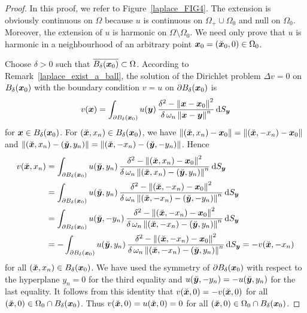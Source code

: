 \begin{proof}
In this proof, we refer to Figure~\ref{laplace_FIG4}.
The extension is obviously continuous on $\Omega$ because $u$ is
continuous on $\Omega_+\cup \Omega_0$ and null on $\Omega_0$.
Moreover, the extension of $u$ is harmonic on $\Omega \setminus \Omega_0$.
We need only prove that $u$ is harmonic in a neighbourhood of an
arbitrary point ${\bm{x}}_0 = (\breve{{\bm{x}}}_0,0) \in \Omega_0$.

Choose $\delta >0$ such that $\overline{B_\delta({\bm{x}}_0)} \subset \Omega$.
According to Remark~\ref{laplace_exist_a_ball}, the solution of the
Dirichlet problem
$\Delta v = 0$ on $B_\delta({\bm{x}}_0)$ with the boundary condition $v=u$ on
$\partial B_\delta({\bm{x}}_0)$ is
\[
v({\bm{x}}) = \int_{\partial B_\delta({\bm{x}}_0)} u({\bm{y}}) \,
\frac{\delta^2-\left\|{\bm{x}}-{\bm{x}}_0\right\|^2}
{\delta \, \omega_n \left\|{\bm{x}}-{\bm{y}}\right\|^n} \,\mathrm{d}{S}_{{\bm{y}}}
\]
for ${\bm{x}} \in B_\delta({\bm{x}}_0)$.
For $(\breve{{\bm{x}}},x_n) \in B_\delta({\bm{x}}_0)$, we have
$\displaystyle \|(\breve{{\bm{x}}},x_n)-{\bm{x}}_0\| =
\|(\breve{{\bm{x}}},-x_n)-{\bm{x}}_0\|$
and
$\displaystyle \|(\breve{{\bm{x}}},x_n)-(\breve{{\bm{y}}},y_n)\| =
\|(\breve{{\bm{x}}},-x_n)-(\breve{{\bm{y}}}, -y_n)\|$.
Hence
\begin{align*}
v(\breve{{\bm{x}}},x_n) &=
\int_{\partial B_\delta({\bm{x}}_0)} u(\breve{{\bm{y}}},y_n) \,
\frac{\delta^2-\left\| (\breve{{\bm{x}}},x_n) - {\bm{x}}_0\right\|^2}
{\delta \, \omega_n \left\|(\breve{{\bm{x}}},x_n)
-(\breve{{\bm{y}}},y_n) \right\|^n} \,\mathrm{d}{S}_{{\bm{y}}} \\
&= \int_{\partial B_\delta({\bm{x}}_0)} u(\breve{{\bm{y}}},y_n) \,
\frac{\delta^2-\left\| (\breve{{\bm{x}}},-x_n) - {\bm{x}}_0\right\|^2}
{\delta \, \omega_n \left\|(\breve{{\bm{x}}},-x_n) -
(\breve{{\bm{y}}},-y_n) \right\|^n} \,\mathrm{d}{S}_{{\bm{y}}} \\
&= \int_{\partial B_\delta({\bm{x}}_0)}
u(\breve{{\bm{y}}},-y_n) \,
\frac{\delta^2-\left\| (\breve{{\bm{x}}},-x_n) - {\bm{x}}_0\right\|^2}
{\delta \, \omega_n \left\|(\breve{{\bm{x}}},-x_n) -
(\breve{{\bm{y}}},y_n) \right\|^n} \,\mathrm{d}{S}_{{\bm{y}}} \\
&= -\int_{\partial B_\delta({\bm{x}}_0)}
u(\breve{{\bm{y}}},y_n) \,
\frac{\delta^2-\left\| (\breve{{\bm{x}}},-x_n) - {\bm{x}}_0\right\|^2}
{\delta \, \omega_n \left\|(\breve{{\bm{x}}},-x_n) -
(\breve{{\bm{y}}},y_n) \right\|^n} \,\mathrm{d}{S}_{{\bm{y}}} =
-v(\breve{{\bm{x}}},-x_n)
\end{align*}
for all $(\breve{{\bm{x}}},x_n) \in B_\delta({\bm{x}}_0)$.  We have
used the symmetry of $\partial B_\delta({\bm{x}}_0)$ with respect to
the hyperplane $y_n=0$ for the third equality and
$u(\breve{{\bm{y}}},-y_n) = -u(\breve{{\bm{y}}},y_n)$ for the last
equality.  It follows from this identity that
$v(\breve{{\bm{x}}},0) = - v(\breve{{\bm{x}}},0)$ for
all $(\breve{{\bm{x}}},0) \in \Omega_0 \cap B_\delta({\bm{x}}_0)$.  Thus
$v(\breve{{\bm{x}}},0) = u(\breve{{\bm{x}}},0)= 0$ for all
$(\breve{{\bm{x}}},0) \in \Omega_0 \cap B_\delta({\bm{x}}_0)$. 


\end{proof}
